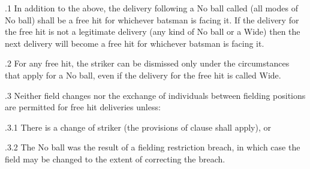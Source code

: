\documentclass[12pt]{article}
\begin{document}
\vspace{\baselineskip}
\begin{adjustwidth}{0.5in}{0.14in}
{\fontsize{9pt}{10.8pt}.1 In addition to the above, the delivery following a No ball called (all modes of No ball) shall be a free hit for whichever batsman is facing it. If the delivery for the free hit is not a legitimate delivery (any kind of No ball or a Wide) then the next delivery will become a free hit for whichever batsman is facing it.\par}\par

\end{adjustwidth}


\vspace{\baselineskip}
\begin{adjustwidth}{0.5in}{0.15in}
{\fontsize{9pt}{10.8pt}.2 For any free hit, the striker can be dismissed only under the circumstances that apply for a No ball, even if the delivery for the free hit is called Wide.\par}\par

\end{adjustwidth}


\vspace{\baselineskip}
\begin{adjustwidth}{0.5in}{0.24in}
{\fontsize{9pt}{10.8pt}.3 Neither field changes nor the exchange of individuals between fielding positions are permitted for free hit deliveries unless:\par}\par

\end{adjustwidth}


\vspace{\baselineskip}
\begin{adjustwidth}{0.49in}{0.0in}
{\fontsize{9pt}{10.8pt}.3.1 \tabto{1.17in} There is a change of striker (the provisions of clause shall apply), or\par}\par

\end{adjustwidth}


\vspace{\baselineskip}
\begin{adjustwidth}{1.18in}{0.47in}
{\fontsize{9pt}{10.8pt}.3.2 \tabto{1.17in} The No ball was the result of a fielding restriction breach, in which case the field may be changed to the extent of correcting the breach.\par}\par

\end{adjustwidth}
\end{document}

